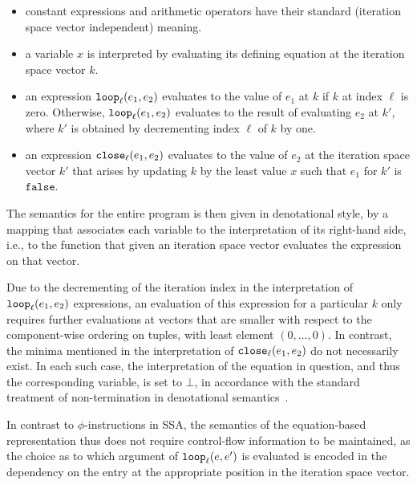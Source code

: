 \begin{itemize} 

\item 
constant expressions and arithmetic operators have their standard
(iteration space vector independent) meaning.

\item a variable $x$ is interpreted by evaluating its defining
equation at the iteration space vector $k$.

\item an expression $\mathtt{loop}_{{\ell}}({e_1},{e_2})$ evaluates to the value of
$e_1$ at $k$ if $k$ at index $\ell$ is zero. Otherwise, $\mathtt{loop}_{{\ell}}({e_1},{e_2})$ evaluates to the result of evaluating $e_2$ at $k'$,
where $k'$ is obtained by decrementing index $\ell$ of $k$ by one.

\item an expression $\mathtt{close}_{{\ell}}({e_1},{e_2})$ evaluates to the value
of $e_2$ at the iteration space vector $k'$ that arises by updating
$k$ by the least value $x$ such that $e_1$ for $k'$ is
$\mathtt{false}$.

\end{itemize}

The semantics for the entire program is then given in denotational
style, by a mapping that associates each variable to the
interpretation of its right-hand side, i.e., to the function that given
an iteration space vector evaluates the expression on that vector.

Due to the decrementing of the iteration index in the interpretation
of $\mathtt{loop}_{{\ell}}({e_1},{e_2})$ expressions, an evaluation of this
expression for a particular $k$ only requires further evaluations at
vectors that are smaller with respect to the component-wise ordering
on tuples, with least element $(0,\ldots,0)$. In contrast, the minima
mentioned in the interpretation of $\mathtt{close}_{{\ell}}({e_1},{e_2})$ do not necessarily exist. In each such case, the interpretation
of the equation in question, and thus the corresponding variable, is
set to $\bot$, in accordance with the standard treatment of
non-termination in denotational semantics~\cite{winskel_93_formal}.

In contrast to $\phi$-instructions in SSA, the semantics of the
equation-based representation thus does not require control-flow
information to be maintained, as the choice as to which argument of
$\mathtt{loop}_{{\ell}}({e},{e'})$ is evaluated is encoded in the dependency on
the entry at the appropriate position in the iteration space vector.

